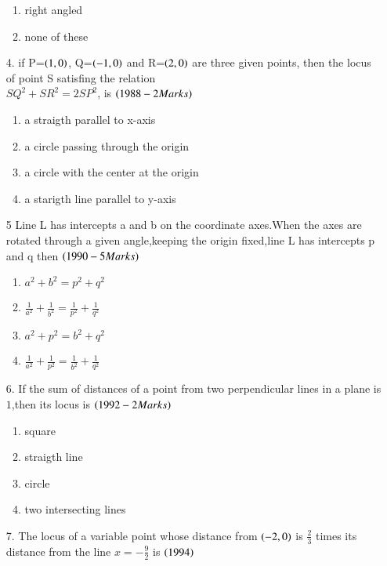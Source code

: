 \documentclass[journal,12pt,onecolumn]{IEEEtran}
\theoremstyle{remark}
\begin{document}
\begin{enumerate}
\begin{enumerate}
     \item right angled
     \item none of these
\end{enumerate}
\item[4.] if P=$\left(1,0\right)$, Q=$\left(-1,0\right)$ and R=$\left(2,0\right)$ are three given points, then the locus of point S satisfing the relation\\$SQ^2+SR^2=2SP^2$, is 
\hfill{$\left(1988-2 Marks\right)$}
\begin{enumerate}
    \item a straigth parallel to x-axis
    \item a circle passing through the origin
    \item a circle with the center at the origin 
    \item a starigth line parallel to y-axis 
\end{enumerate}
\item[5] Line L has intercepts a and b on the coordinate axes.When the axes are rotated through a given angle,keeping the origin fixed,line L has intercepts p and q then
\hfill{$\left(1990-5 Marks\right)$}
\begin{enumerate}
    
    \item $a^2+b^2=p^2+q^2$
    \item $\frac{1}{a^2}+\frac{1}{b^2}=\frac{1}{p^2}+\frac{1}{q^2}$
    \item $a^2+p^2=b^2+q^2$
    \item $\frac{1}{a^2}+\frac{1}{p^2}=\frac{1}{b^2}+\frac{1}{q^2}$
    
\end{enumerate}
\item[6.] If the sum of distances of a point from two perpendicular lines in a plane is $1$,then its locus is
\hfill{$\left(1992-2 Marks\right)$}
\begin{enumerate}
    
        \item square
        \item straigth line
        \item circle
        \item two intersecting lines
    
\end{enumerate}
\item[7.] The locus of a variable point whose distance from $\left(-2,0\right)$ is $\frac{2}{3}$ times its distance from the line $x=-\frac{9}{2}$ is
\hfill{$\left(1994\right)$}
\begin{enumerate}
    

\end{enumerate}
\end{enumerate}
\end{document}
